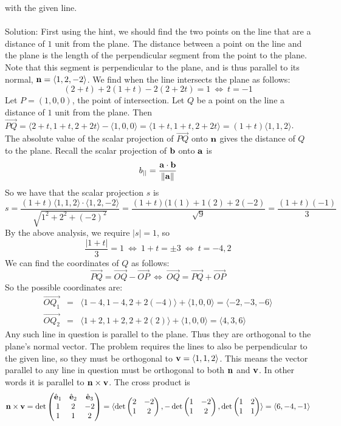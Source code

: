 \documentclass[12pt]{amsbook}
\newcommand{\la}{\langle}
\newcommand{\ra}{\rangle}
\begin{document}
with the given line. \\
\\
{\sc Solution}: First using the hint, we should find the two points on the line that are a distance of $1$ unit from the plane. The distance between a point on the line and the plane is the length of the perpendicular segment from the point to the plane. Note that this segment is perpendicular to the plane, and is thus parallel to its normal, ${\bf n}=\la 1,2,-2 \ra$. We find when the line intersects the plane as follows:
$$(2+t)+2(1+t)-2(2+2t)=1 \ \Leftrightarrow \ t=-1$$
Let $P=(1,0,0)$, the point of intersection. Let $Q$ be a point on the line a distance of $1$ unit from the plane. Then $\overrightarrow{PQ}=\la 2+t, 1+t, 2+2t\ra - \la 1,0,0\ra = \la 1+t,1+t,2+2t\ra=(1+t)\la1,1,2 \ra$. The absolute value of the scalar projection of $\overrightarrow{PQ}$ onto ${\bf n}$ gives the distance of $Q$ to the plane. Recall the scalar projection of ${\bf b}$ onto ${\bf a}$ is
$$b_{||}=\frac{{\bf a}\cdot{\bf b}}{\|{\bf a}\|}$$
So we have that the scalar projection $s$ is
$$s=\frac{(1+t)\la 1,1,2 \ra \cdot \la 1,2,-2\ra}{\sqrt{1^2+2^2+(-2)^2}}=\frac{(1+t)(1(1)+1(2)+2(-2)}{\sqrt{9}}=\frac{(1+t)(-1)}{3}$$
By the above analysis, we require $|s|=1$, so
$$\frac{|1+t|}{3}=1 \ \Leftrightarrow \ 1+t= \pm 3 \ \Leftrightarrow \ t=-4,2$$
We can find the coordinates of $Q$ as follows:
$$ \overrightarrow{PQ}=\overrightarrow{OQ}-\overrightarrow{OP} \ \Leftrightarrow \ \overrightarrow{OQ}=\overrightarrow{PQ}+\overrightarrow{OP}$$
So the possible coordinates are:
\begin{eqnarray*}
\overrightarrow{OQ_1}&=&\la 1-4,1-4,2+2(-4) \ra + \la 1,0,0 \ra = \la -2, -3, -6 \ra \\
\overrightarrow{OQ_2}&=&\la 1+2,1+2,2+2(2) \ra + \la 1,0,0 \ra = \la 4, 3, 6 \ra
\end{eqnarray*}
Any such line in question is parallel to the plane. Thus they are orthogonal to the plane's normal vector. The problem requires the lines to also be perpendicular to the given line, so they must be orthogonal to ${\bf v}=\la 1,1,2 \ra$. This means the vector parallel to any line in question must be orthogonal to both ${\bf n}$ and ${\bf v}$. In other words it is parallel to ${\bf n}\times{\bf v}$. The cross product is
$${\bf n}\times{\bf v}=\det
\begin{pmatrix}
\hat{\bf e}_1 & \hat{\bf e}_2 & \hat{\bf e}_3\cr 1&2&-2\cr 1&1&2 \end{pmatrix}=\la \det\begin{pmatrix}2&-2\cr 1&2  \end{pmatrix}, -\det\begin{pmatrix}1&-2\cr 1&2  \end{pmatrix}, \det\begin{pmatrix}
1&2\cr 1&1 \end{pmatrix} \ra = \la 6,-4,-1 \ra$$
\end{document}
